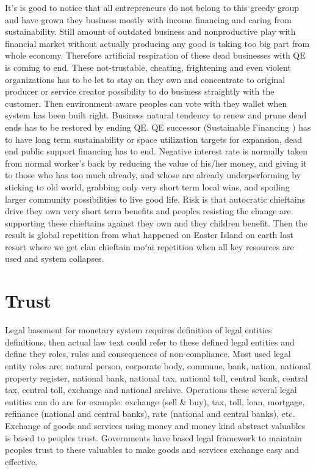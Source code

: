 It's is good to notice that all entrepreneurs do not belong to this greedy
group and have grown they business mostly with income financing and caring
from sustainability. Still amount of outdated business and nonproductive play
with financial market without actually producing any good is taking too big
part from whole economy. Therefore artificial respiration of these dead
businesses with QE is coming to end. These not-trustable, cheating,
frightening and even violent organizations has to be let to stay on they own
and concentrate to original producer or service creator possibility to do
business straightly with the customer. Then environment aware peoples can vote
with they wallet when system has been built right. Business natural tendency
to renew and prune dead ends has to be restored by ending QE. QE successor
(Sustainable Financing \cite{EU_Sustainable_finance}) has to have long term
sustainability or space utilization targets for expansion, dead end public
support financing has to end. Negative interest rate is normally taken from
normal worker's back by reducing the value of his/her money, and giving it to
those who has too much already, and whose are already underperforming by
sticking to old world, grabbing only very short term local wins, and spoiling
larger community possibilities to live good life. Risk is that autocratic
chieftains drive they own very short term benefits and peoples resisting the
change are supporting these chieftains against they own and they children
benefit. Then the result is global repetition from what happened on Easter
Island on earth last resort where we get clan chieftain moʻai repetition when
all key resources are used and system collapses.

\section{Trust}
\label{trust}
Legal basement for monetary system requires definition of legal entities
definitions, then actual law text could refer to these defined legal entities
and define they roles, rules and consequences of non-compliance. Most used
legal entity roles are; natural person, corporate body, commune, bank, nation,
national property register, national bank, national tax, national toll,
central bank, central tax, central toll, exchange and national archive.
Operations these several legal entities can do are for example: exchange (sell
\& buy), tax, toll, loan, mortgage, refinance (national and central banks),
rate (national and central banks), etc. Exchange of goods and services using
money and money kind abstract valuables is based to peoples trust. Governments
have based legal framework to maintain peoples trust to these valuables to
make goods and services exchange easy and effective.

